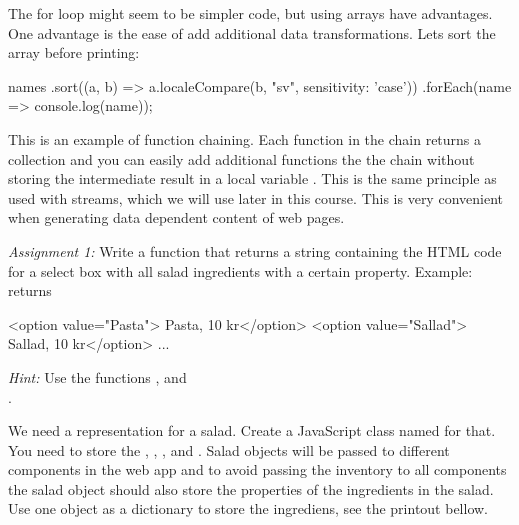 \documentclass[fleqn, article, a4paper]{memoir}
\begin{document}
\begin{Assignments}
The for loop might seem to be simpler code, but using arrays have advantages. One advantage is the ease of add additional data transformations. Lets sort the array before printing:
\begin{Code}
names
.sort((a, b) => a.localeCompare(b, "sv", {sensitivity: 'case'}))
.forEach(name => console.log(name));
\end{Code}
This is an example of function chaining. Each function in the chain returns a collection and you can easily add additional functions the the chain without storing the intermediate result in a local variable . This is the same principle as used with streams, which we will use later in this course. This is very convenient when generating data dependent content of web pages.

\emph{Assignment 1:} Write a function that returns a string containing the HTML code for a select box with all salad ingredients with a certain property. Example:
 returns 
\begin{Code}
<option value="Pasta"> Pasta, 10 kr</option>
<option value="Sallad"> Sallad, 10 kr</option> ...
\end{Code}
\emph{Hint:} Use the functions ,  and \\.

\item We need a representation for a salad. Create a JavaScript class named  for that. You need to store the , , , and . Salad objects will be passed to different components in the web app and to avoid passing the inventory to all components the salad object should also store the properties of the ingredients in the salad. Use one object as a dictionary to store the ingrediens, see the printout bellow.


\end{Assignments}
\end{document}
